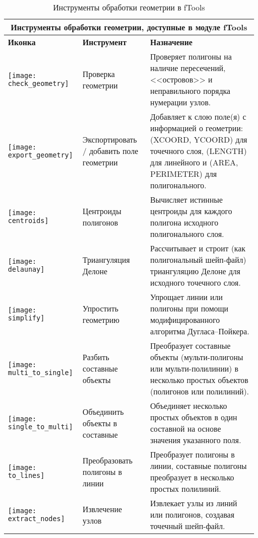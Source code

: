 \begin{table}[ht]
\centering
\begin{tabular}{|m{1cm}|m{3cm}|m{9cm}|}
 \hline \multicolumn{3}{|c|}{\textbf{Инструменты обработки геометрии, доступные в  модуле fTools}} \\
 \hline \textbf{Иконка} & \textbf{Инструмент} & \textbf{Назначение} \\
 \hline \texttt{[image: check\_geometry]} & Проверка геометрии &
 Проверяет полигоны на наличие пересечений, <<островов>> и неправильного порядка нумерации узлов. \\
 \hline \texttt{[image: export\_geometry]} & Экспортировать / добавить поле
 геометрии & Добавляет к слою поле(я) с информацией о геометрии: (XCOORD, YCOORD) для точечного
 слоя, (LENGTH) для линейного и (AREA, PERIMETER) для полигонального. \\
 \hline \texttt{[image: centroids]} & Центроиды полигонов &
 Вычисляет истинные центроиды для каждого полигона исходного полигонального слоя. \\
 \hline \texttt{[image: delaunay]} & Триангуляция Делоне &
 Рассчитывает и строит (как полигональный шейп-файл) триангуляцию Делоне для исходного точечного слоя. \\
 \hline \texttt{[image: simplify]} & Упростить геометрию &
 Упрощает линии или полигоны при помощи модифицированного алгоритма Дугласа--Пойкера. \\
 \hline \texttt{[image: multi\_to\_single]} & Разбить составные
 объекты & Преобразует составные объекты (мульти-полигоны или мульти-полилинии)
 в несколько простых объектов (полигонов или полилиний). \\
 \hline \texttt{[image: single\_to\_multi]} & Объединить
 объекты в составные & Объединяет несколько простых объектов в один составной
 на основе значения указанного поля. \\
 \hline \texttt{[image: to\_lines]} & Преобразовать полигоны в линии
 & Преобразует полигоны в линии, составные полигоны преобразует в несколько простых полилиний. \\
 \hline \texttt{[image: extract\_nodes]} & Извлечение узлов &
 Извлекает узлы из линий или полигонов, создавая точечный шейп-файл. \\
 \hline
\end{tabular}
\caption{Инструменты обработки геометрии в fTools}\label{tab:ftool_geometry}
\end{table}

